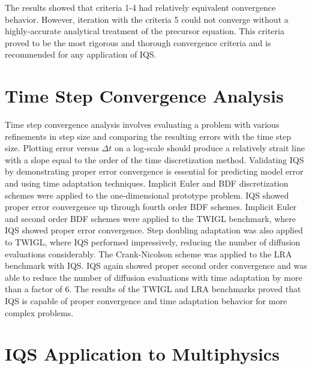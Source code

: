 The results showed that criteria 1-4 had relatively equivalent convergence behavior. However, iteration with the criteria 5 could not converge without a highly-accurate analytical treatment of the precursor equation. This criteria proved to be the most rigorous and thorough convergence criteria and is recommended for any application of IQS.

\section{Time Step Convergence Analysis}

Time step convergence analysis involves evaluating a problem with various refinements in step size and comparing the resulting errors with the time step size. Plotting error versus $\Delta t$ on a log-scale should produce a relatively strait line with a slope equal to the order of the time discretization method. Validating IQS by demonstrating proper error convergence is essential for predicting model error and using time adaptation techniques. Implicit Euler and BDF discretization schemes were applied to the one-dimensional prototype problem. IQS showed proper error convergence up through fourth order BDF schemes. Implicit Euler and second order BDF schemes were applied to the TWIGL benchmark, where IQS showed proper error convergence. Step doubling adaptation was also applied to TWIGL, where IQS performed impressively, reducing the number of diffusion evaluations considerably. The Crank-Nicolson scheme was applied to the LRA benchmark with IQS. IQS again showed proper second order convergence and was able to reduce the number of diffusion evaluations with time adaptation by more than a factor of 6. The results of the TWIGL and LRA benchmarks proved that IQS is capable of proper convergence and time adaptation behavior for more complex problems.

\section{IQS Application to Multiphysics}

